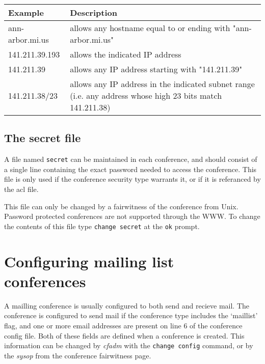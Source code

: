 \documentclass[twoside]{report}
\begin{document}
        \begin{tabular}{lp{4.5in}} 
           Example & Description \\ \hline
           ann-arbor.mi.us  &  allows any hostname equal to or ending with
                               "ann-arbor.mi.us" \\
           141.211.39.193   &  allows the indicated IP address\\
           141.211.39       &  allows any IP address starting with 
                               "141.211.39" \\
           141.211.38/23    &  allows any IP address in the indicated subnet
                               range (i.e. any address whose high 23 bits match
                               141.211.38) \\
        \end{tabular}


      \subsection{The secret file} \label{s:secret}
          A file named {\tt secret} can be maintained in each conference,
          and should consist of a single line containing the
          exact password needed to access the conference.  
          This file is only used if the conference security type warrants it, 
          or if it is referanced by the acl file.
 
          This file can only be changed by a fairwitness of the conference
          from Unix.  Password protected conferences are not supported 
          through the WWW.  To change the contents of this file type 
          {\tt change secret} at the {\tt ok} prompt.  

   



   \section{Configuring mailing list conferences} \label{s:maillist}
      A mailling conference is usually configured to both send
      and recieve mail.  The conference is configured to send mail
      if the conference type includes the `maillist' flag, and 
      one or more email addresses are present on line 6 of the conference 
      config file.  Both of these fields are defined when a conference
      is created.  This information can be changed by {\em cfadm} 
      with the {\tt change config} command, or by the {\em sysop} 
      from the conference fairwitness page.
\end{document}
